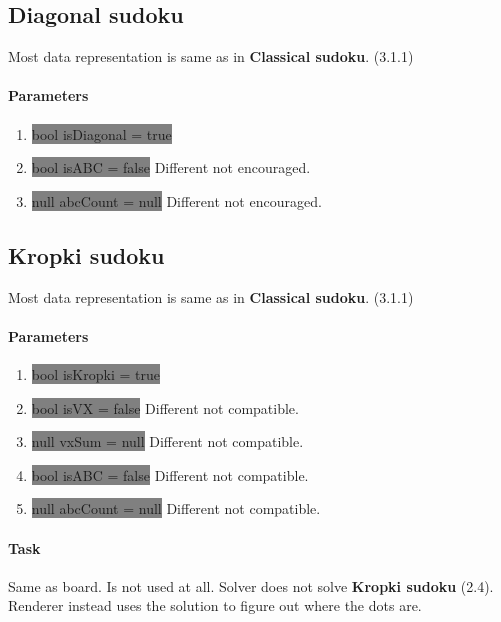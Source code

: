 \documentclass{report}
\begin{document}
\subsection{Diagonal sudoku}

Most data representation is same as in \textbf{Classical sudoku}. (3.1.1)

\paragraph{Parameters}
\begin{enumerate}
    \item[] \colorbox{gray}{bool isDiagonal = true}
    \item[] \colorbox{gray}{bool isABC = false} Different not encouraged.
    \item[] \colorbox{gray}{null abcCount = null} Different not encouraged.
\end{enumerate}

\subsection{Kropki sudoku}

Most data representation is same as in \textbf{Classical sudoku}. (3.1.1)

\paragraph{Parameters}
\begin{enumerate}
    \item[] \colorbox{gray}{bool isKropki = true}
    \item[] \colorbox{gray}{bool isVX = false} Different not compatible.
    \item[] \colorbox{gray}{null vxSum = null} Different not compatible.
    \item[] \colorbox{gray}{bool isABC = false} Different not compatible.
    \item[] \colorbox{gray}{null abcCount = null} Different not compatible.
\end{enumerate}

\paragraph{Task}
Same as board. Is not used at all. Solver does not solve \textbf{Kropki sudoku} (2.4). Renderer instead uses the solution to figure out where the dots are.
\end{document}
